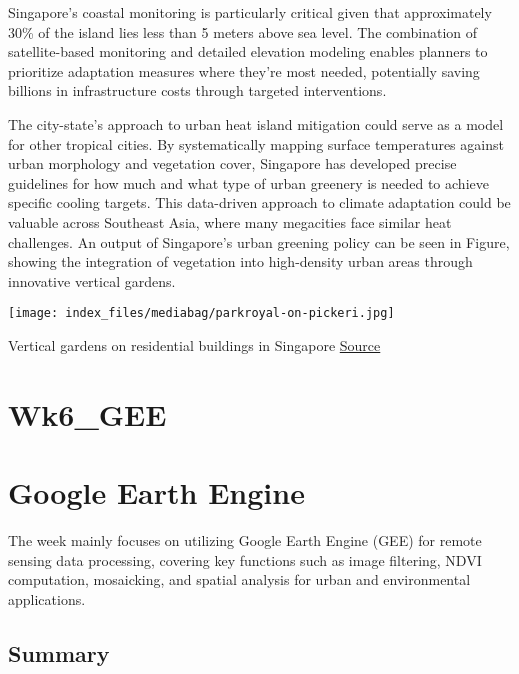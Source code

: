 \documentclass[
  letterpaper,
  DIV=11,
  numbers=noendperiod]{scrreprt}
\begin{document}
Singapore's coastal monitoring is particularly critical given that
approximately 30\% of the island lies less than 5 meters above sea
level. The combination of satellite-based monitoring and detailed
elevation modeling enables planners to prioritize adaptation measures
where they're most needed, potentially saving billions in infrastructure
costs through targeted interventions.

The city-state's approach to urban heat island mitigation could serve as
a model for other tropical cities. By systematically mapping surface
temperatures against urban morphology and vegetation cover, Singapore
has developed precise guidelines for how much and what type of urban
greenery is needed to achieve specific cooling targets. This data-driven
approach to climate adaptation could be valuable across Southeast Asia,
where many megacities face similar heat challenges. An output of
Singapore's urban greening policy can be seen in Figure, showing the
integration of vegetation into high-density urban areas through
innovative vertical gardens.

\texttt{[image: index\_files/mediabag/parkroyal-on-pickeri.jpg]}

Vertical gardens on residential buildings in Singapore
\href{https://www.crabintheair.com/wp-content/uploads/2017/02/parkroyal-on-pickering-review-e1537299078683.jpg}{Source}


\chapter{Wk6\_GEE}\label{wk6_gee}


\chapter{Google Earth Engine}\label{google-earth-engine}

The week mainly focuses on utilizing Google Earth Engine (GEE) for
remote sensing data processing, covering key functions such as image
filtering, NDVI computation, mosaicking, and spatial analysis for urban
and environmental applications.

\section{Summary}\label{summary-2}
\end{document}

